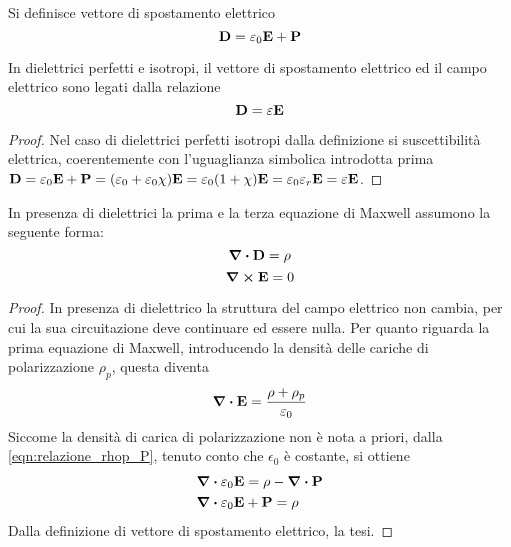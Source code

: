 \begin{defn}
    Si definisce vettore di spostamento elettrico
    \[
        \vb{D}=\varepsilon_0\vb{E}+\vb{P}
    \]
\end{defn}

\begin{obs}
    In dielettrici perfetti e isotropi, il vettore di spostamento elettrico ed il campo elettrico sono legati dalla relazione
    \begin{equation}
        \vb{D}=\varepsilon\vb{E}
        \label{eqn:rel_D_E}
    \end{equation}
\end{obs}
\begin{proof}
    Nel caso di dielettrici perfetti isotropi dalla definizione si suscettibilità elettrica,
    coerentemente con l'uguaglianza simbolica introdotta prima
    $\vb{D}=\varepsilon_0\vb{E}+\vb{P}=(\varepsilon_0+\varepsilon_0\chi)\vb{E}=\varepsilon_0(1+\chi)\vb{E}=\varepsilon_0\varepsilon_r\vb{E=\varepsilon\vb{E}}$.
\end{proof}

\begin{thm}
    In presenza di dielettrici la prima e la terza equazione di Maxwell assumono la seguente forma:
    \begin{equation}
        \div{\vb{D}}=\rho
    \end{equation}
    \begin{equation}
        \curl{\vb{E}}=0
    \end{equation}
\end{thm}
\begin{proof}
    In presenza di dielettrico la struttura del campo elettrico non cambia, per cui la sua circuitazione
    deve continuare ed essere nulla. Per quanto riguarda la prima equazione di Maxwell,
    introducendo la densità delle cariche di polarizzazione $\rho_p$, questa diventa
    \[
        \div{\vb{E}}=\frac{\rho+\rho_p}{\varepsilon_0}
    \]
    Siccome la densità di carica di polarizzazione non è nota a priori, dalla \eqref{eqn:relazione_rhop_P},
    tenuto conto che $\epsilon_0$ è costante, si ottiene
    \[
        \begin{split}
            & \div{\varepsilon_0 \vb{E}}=\rho-\div{\vb{P}}\\
            & \div{\varepsilon_0 \vb{E}+\vb{P}=\rho}
        \end{split}
    \]
    Dalla definizione di vettore di spostamento elettrico, la tesi.
\end{proof}
